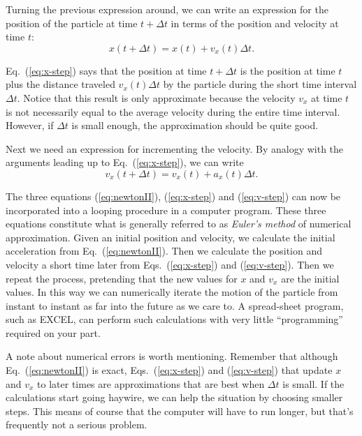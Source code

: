 Turning the previous expression around, we can write an expression for
the position of the particle at time $t + \Delta t$ in terms of the
position and velocity at time $t$:
\begin{equation}
  x(t+\Delta t) = x(t) + v_x(t)\Delta t.
  \label{eq:x-step}
\end{equation}

Eq.~(\ref{eq:x-step}) says that the position at time $t + \Delta t$ is
the position at time $t$ plus the distance traveled $v_x(t)\Delta t$ by
the particle during the short time interval $\Delta t$.  Notice that
this result is only approximate because the velocity $v_x$ at time $t$
is not necessarily equal to the average velocity during the entire
time interval.  However, if $\Delta t$ is small enough, the
approximation should be quite good.
   
Next we need an expression for incrementing the velocity.  By analogy
with the arguments leading up to Eq.~(\ref{eq:x-step}), we can write
\begin{equation}
  v_x(t+\Delta t) = v_x(t) + a_x(t)\Delta t.
  \label{eq:v-step}
\end{equation}

The three equations (\ref{eq:newtonII}), (\ref{eq:x-step}) and
(\ref{eq:v-step}) can now be incorporated into a looping procedure in
a computer program.  These three equations constitute what is
generally referred to as {\em Euler's method} of numerical
approximation.  Given an initial position and velocity, we calculate
the initial acceleration from Eq.~(\ref{eq:newtonII}).  Then we
calculate the position and velocity a short time later from
Eqs.~(\ref{eq:x-step}) and (\ref{eq:v-step}).  Then we repeat the
process, pretending that the new values for $x$ and $v_x$ are the
initial values.  In this way we can numerically iterate the motion of
the particle from instant to instant as far into the future as we care
to.  A spread-sheet program, such as EXCEL, can perform such
calculations with very little ``programming'' required on your part.

A note about numerical errors is worth mentioning.  Remember that
although Eq.~(\ref{eq:newtonII}) is exact, Eqs.~(\ref{eq:x-step}) and
(\ref{eq:v-step}) that update $x$ and $v_x$ to later times are
approximations that are best when $\Delta t$ is small.  If the
calculations start going haywire, we can help the situation by
choosing smaller steps.  This means of course that the computer will
have to run longer, but that's frequently not a serious problem.

